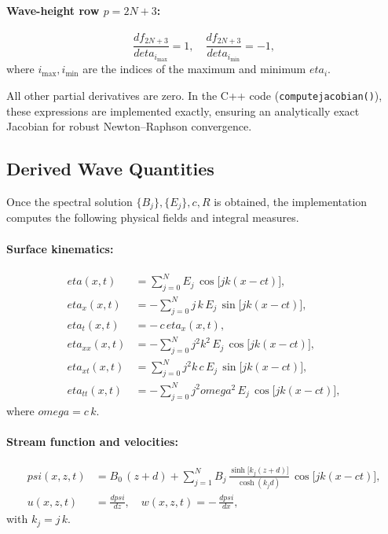 \documentclass[journal,10pt,twocolumn]{IEEEtran}
\def\omega{omega}%
\def\eta{eta}%
\def\psi{psi}%
\def\partial{d}%
\def\_{}%
\begin{document}
    \paragraph{Wave-height row $p=2N+3$:}
    \[
        \frac{\partial f_{2N+3}}{\partial \eta_{i_{\max}}} = 1,
        \quad
        \frac{\partial f_{2N+3}}{\partial \eta_{i_{\min}}} = -1,
    \]
    where $i_{\max},i_{\min}$ are the indices of the maximum and minimum $\eta_{i}$.

    \medskip
    All other partial derivatives are zero. In the C++ code (\texttt{compute\_jacobian()}), these expressions are implemented exactly, ensuring an analytically exact Jacobian for robust Newton--Raphson convergence.

    \subsection{Derived Wave Quantities}
    \label{sec:derived_quantities}

    Once the spectral solution $\{B_j\},\{E_j\},c,R$ is obtained, the implementation computes the following physical fields and integral measures.

    \paragraph{Surface kinematics:}
    \begin{align}
        \eta(x,t) &= \sum_{j=0}^{N} E_{j}\,\cos\bigl[jk(x - ct)\bigr], \\
        \eta_{x}(x,t) &= -\sum_{j=0}^{N} j\,k\,E_{j}\,\sin\bigl[jk(x - ct)\bigr], \\
        \eta_{t}(x,t) &= -\,c\,\eta_{x}(x,t), \\
        \eta_{xx}(x,t) &= -\sum_{j=0}^{N} j^{2}k^{2}\,E_{j}\,\cos\bigl[jk(x - ct)\bigr], \\
        \eta_{xt}(x,t) &= \sum_{j=0}^{N} j^{2}k\,c\,E_{j}\,\sin\bigl[jk(x - ct)\bigr], \\
        \eta_{tt}(x,t) &= -\sum_{j=0}^{N} j^{2}\omega^{2}\,E_{j}\,\cos\bigl[jk(x - ct)\bigr],
    \end{align}
    where $\omega = c\,k$.

    \paragraph{Stream function and velocities:}
    \begin{align}
        \psi(x,z,t)
        &= B_{0}\,(z + d)
        + \sum_{j=1}^{N} B_{j}\,
        \frac{\sinh\!\bigl[k_{j}(z + d)\bigr]}{\cosh(k_{j}d)}\,
        \cos\bigl[jk(x - ct)\bigr],
        \\
        u(x,z,t) &= \frac{\partial \psi}{\partial z},
        \quad
        w(x,z,t) = -\,\frac{\partial \psi}{\partial x},
    \end{align}
    with $k_{j}=j\,k$.
\end{document}
